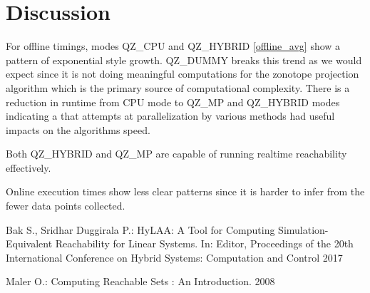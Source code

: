 \documentclass[runningheads]{llncs}
\begin{document}
\section{Discussion}

For offline timings, modes QZ\_CPU and QZ\_HYBRID \ref{offline_avg} show a pattern of exponential style growth. QZ\_DUMMY breaks this trend as we would expect since it is not doing meaningful computations for the zonotope projection algorithm which is the primary source of computational complexity. There is a reduction in runtime from CPU mode to QZ\_MP and QZ\_HYBRID modes indicating a that attempts at parallelization by various methods had useful impacts on the algorithms speed.

Both QZ\_HYBRID and QZ\_MP are capable of running realtime reachability effectively. 

Online execution times show less clear patterns since it is harder to infer from the fewer data points collected. 

%
%
%
% 
% 
%
\begin{thebibliography}{8}


Bak S., Sridhar Duggirala P.: HyLAA: A Tool for Computing Simulation-Equivalent Reachability for Linear Systems. In: Editor,
Proceedings of the 20th International Conference on Hybrid Systems: Computation and Control 2017

Maler O.: Computing Reachable Sets : An Introduction. 2008

\end{thebibliography}
\end{document}
